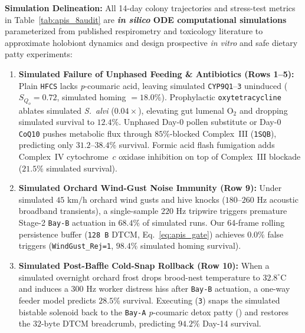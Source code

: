 \documentclass[11pt]{article}
\begin{document}
\noindent\textbf{Simulation Delineation:} All 14-day colony trajectories and stress-test metrics in Table~\ref{tab:apis_8audit} are \textbf{\textit{in silico} ODE computational simulations} parameterized from published respirometry and toxicology literature \cite{esser2006bc1,degrandi2015fungicides,bartlett2002strobilurin,mao2013pcoumaric,leonard2020salvi} to approximate holobiont dynamics and design prospective \textit{in vitro} and safe dietary patty experiments:
\begin{enumerate}
  \item \textbf{Simulated Failure of Unphased Feeding \& Antibiotics (Rows 1--5):} Plain \texttt{HFCS} lacks \textit{p}-coumaric acid, leaving simulated \texttt{CYP9Q1}--\texttt{3} uninduced ($S_{Q_o} = 0.72$, simulated homing $= 18.0\%$). Prophylactic \texttt{oxytetracycline} ablates simulated \textit{S.\ alvi} ($0.04\times$), elevating gut lumenal $\mathrm{O}_2$ and dropping simulated survival to $12.4\%$. Unphased Day-0 pollen substitute or Day-0 \texttt{CoQ10} pushes metabolic flux through $85\%$-blocked Complex~III (\texttt{1SQB}), predicting only $31.2\text{--}38.4\%$ survival. Formic acid flash fumigation adds Complex~IV cytochrome~$c$ oxidase inhibition on top of Complex~III blockade ($21.5\%$ simulated survival).
  \item \textbf{Simulated Orchard Wind-Gust Noise Immunity (Row 9):} Under simulated $45\text{ km/h}$ orchard wind gusts and hive knocks ($180\text{--}260\text{ Hz}$ acoustic broadband transients), a single-sample $220\text{ Hz}$ tripwire triggers premature Stage-2 \texttt{Bay-B} actuation in $68.4\%$ of simulated runs. Our 64-frame rolling persistence buffer (\texttt{128 B} DTCM, Eq.~\eqref{eq:apis_gate}) achieves $0.0\%$ false triggers (\texttt{WindGust\_Rej=1}, $98.4\%$ simulated homing survival).
  \item \textbf{Simulated Post-Baffle Cold-Snap Rollback (Row 10):} When a simulated overnight orchard frost drops brood-nest temperature to $32.8^\circ\mathrm{C}$ and induces a $300\text{ Hz}$ worker distress hiss after \texttt{Bay-B} actuation, a one-way feeder model predicts $28.5\%$ survival. Executing  (\texttt{3}) snaps the simulated bistable solenoid back to the \texttt{Bay-A} \textit{p}-coumaric detox patty () and restores the $32\text{-byte}$ DTCM breadcrumb, predicting $94.2\%$ Day-14 survival.
\end{enumerate}
\end{document}
